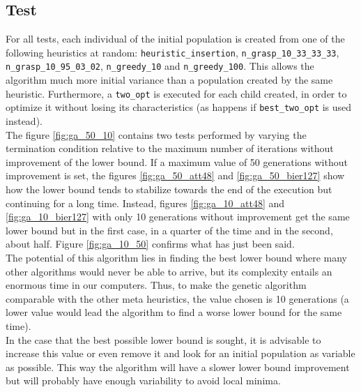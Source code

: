 \subsection{Test}
For all tests, each individual of the initial population is created from one of the following heuristics at random: \texttt{heuristic\_insertion}, \texttt{n\_grasp\_10\_33\_33\_33}, \texttt{n\_grasp\_10\_95\_03\_02}, \texttt{n\_greedy\_10} and \texttt{n\_greedy\_100}. This allows the algorithm much more initial variance than a population created by the same heuristic. Furthermore, a \texttt{two\_opt} is executed for each child created, in order to optimize it without losing its characteristics (as happens if \texttt{best\_two\_opt}  is used instead).\\
The figure \ref{fig:ga_50_10} contains two tests performed by varying the termination condition relative to the maximum number of iterations without improvement of the lower bound. If a maximum value of 50 generations without improvement is set, the figures \ref{fig:ga_50_att48} and \ref{fig:ga_50_bier127} show how the lower bound tends to stabilize towards the end of the execution but continuing for a long time.
Instead, figures \ref{fig:ga_10_att48} and \ref{fig:ga_10_bier127} with only 10 generations without improvement get the same lower bound but in the first case, in a quarter of the time and in the second, about half. Figure \ref{fig:ga_10_50} confirms what has just been said.\\
The potential of this algorithm lies in finding the best lower bound where many other algorithms would never be able to arrive, but its complexity entails an enormous time in our computers.
Thus, to make the genetic algorithm comparable with the other meta heuristics, the value chosen is 10 generations (a lower value would lead the algorithm to find a worse lower bound for the same time).\\
In the case that the best possible lower bound is sought, it is advisable to increase this value or even remove it and look for an initial population as variable as possible.
This way the algorithm will have a slower lower bound improvement but will probably have enough variability to avoid local minima. \\

